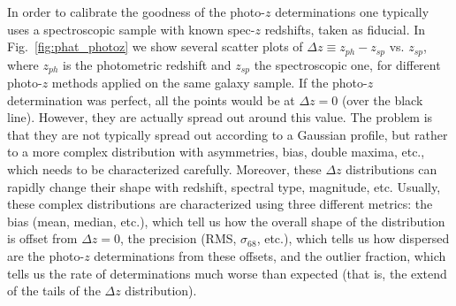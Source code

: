 In order to calibrate the goodness of the photo-$z$ determinations one typically uses a spectroscopic sample with known spec-$z$ redshifts, taken as fiducial. In Fig.~\ref{fig:phat_photoz} we show several scatter plots of $\Delta z \equiv z_{ph} - z_{sp}$ vs. $z_{sp}$, where $z_{ph}$ is the photometric redshift and $z_{sp}$ the spectroscopic one, for different photo-$z$ methods applied on the same galaxy sample. If the photo-$z$ determination was perfect, all the points would be at $\Delta z = 0$ (over the black line). However, they are actually spread out around this value. The problem is that they are not typically spread out according to a Gaussian profile, but rather to a more complex distribution with asymmetries, bias, double maxima, etc., which needs to be characterized carefully. Moreover, these $\Delta z$ distributions can rapidly change their shape with redshift, spectral type, magnitude, etc. Usually, these complex distributions are characterized using three different metrics: the bias (mean, median, etc.), which tell us how the overall shape of the distribution is offset from $\Delta z =0$, the precision (RMS, $\sigma_{68}$, etc.), which tells us how dispersed are the photo-$z$ determinations from these offsets, and the outlier fraction, which tells us the rate of determinations much worse than expected (that is, the extend of the tails of the $\Delta z$ distribution).
